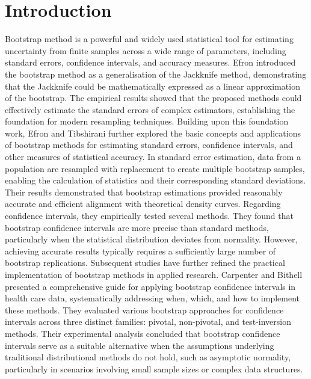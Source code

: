 \documentclass[a4paper,fleqn]{cas-dc}
\begin{document}
\section{Introduction}\label{sec1_intro}
Bootstrap method is a powerful and widely used statistical tool for estimating uncertainty 
from finite samples across a wide range of parameters, %
including standard errors, confidence intervals, and 
accuracy measures. Efron \cite{efron} introduced the bootstrap method as a generalisation of the Jackknife 
method, demonstrating that the Jackknife could be mathematically expressed as a linear approximation 
of the bootstrap. The empirical results showed that the proposed methods could effectively estimate the 
standard errors of complex estimators, establishing the foundation for modern resampling techniques.  
Building upon this foundation work, Efron and Tibshirani \cite{efron2} further explored the basic 
concepts and applications of bootstrap methods for estimating standard errors, confidence intervals, 
and other measures of statistical accuracy. 
In standard error estimation, data from a population are resampled with replacement to 
create multiple bootstrap samples, enabling the calculation of statistics and their corresponding standard deviations. 
Their results demonstrated that bootstrap estimations provided reasonably accurate and 
efficient alignment with theoretical density curves. Regarding confidence intervals, they empirically 
tested several methods. They found that bootstrap confidence intervals are more precise than standard 
methods, particularly when the statistical distribution deviates from normality. However, achieving 
accurate results typically requires a sufficiently large number of bootstrap replications. Subsequent studies have further 
refined the practical implementation of bootstrap methods in applied research. Carpenter and Bithell 
\cite{carpenter} presented a comprehensive guide for applying 
bootstrap confidence intervals in health care data, systematically addressing when, which, and how to 
implement these methods. They evaluated various bootstrap approaches for confidence intervals across 
three distinct families: pivotal, non-pivotal, and test-inversion methods. Their experimental analysis 
concluded that bootstrap confidence intervals serve as a suitable alternative when the assumptions 
underlying traditional distributional methods do not hold, such as asymptotic normality, particularly in 
scenarios involving small sample sizes or complex data structures.
\end{document}
